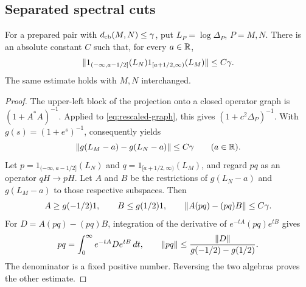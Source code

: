\subsection{Separated spectral cuts}

\begin{corollary}
\label{cor:modular-cuts}
For a prepared pair with $d_{\mathrm{cb}}(M,N)\leq\gamma$, put
$L_P=\log\Delta_P$, $P=M,N$.  There is an absolute constant $C$ such
that, for every $a\in\mathbb R$,
\[
 \lVert1_{(-\infty,a-1/2]}(L_N)
        1_{[a+1/2,\infty)}(L_M)\rVert\leq C\gamma.
\]
The same estimate holds with $M,N$ interchanged.
\end{corollary}

\begin{proof}
The upper-left block of the projection onto a closed operator graph is
$(1+A^*A)^{-1}$.  Applied to \eqref{eq:rescaled-graph}, this gives
$(1+c^2\Delta_P)^{-1}$.  With $g(s)=(1+e^s)^{-1}$,
 consequently yields
\[
 \lVert g(L_M-a)-g(L_N-a)\rVert\leq C\gamma\qquad(a\in\mathbb R).
\]
Let $p=1_{(-\infty,a-1/2]}(L_N)$ and
$q=1_{[a+1/2,\infty)}(L_M)$, and regard $pq$ as an operator
$qH\to pH$.  Let $A$ and $B$ be the restrictions of $g(L_N-a)$ and
$g(L_M-a)$ to those respective subspaces.  Then
\[
 A\geq g(-1/2)1,\qquad B\leq g(1/2)1,
 \qquad\lVert A(pq)-(pq)B\rVert\leq C\gamma.
\]
For $D=A(pq)-(pq)B$, integration of the derivative of
$e^{-tA}(pq)e^{tB}$ gives
\[
 pq=\int_0^\infty e^{-tA}D e^{tB}\,dt,
 \qquad
 \lVert pq\rVert\leq\frac{\lVert D\rVert}{g(-1/2)-g(1/2)}.
\]
The denominator is a fixed positive number.  Reversing the two algebras
proves the other estimate.
\end{proof}
